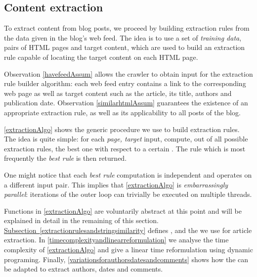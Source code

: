 \subsection{Content extraction}
\label{contentextraction}

To extract content from blog posts, we proceed by building extraction rules from the data given in the blog's web feed. The idea is to use a set of \emph{training data}, pairs of HTML pages and target content, which are used to build an extraction rule capable of locating the target content on each HTML page.

Observation \ref{havefeedAssum} allows the crawler to obtain input for the extraction rule builder algorithm: each web feed entry contains a link to the corresponding web page as well as target content such as the article, its title, authors and publication date. Observation \ref{similarhtmlAssum} guarantees the existence of an appropriate extraction rule, as well as its applicability to all posts of the blog.

\autoref{extractionAlgo} shows the generic procedure we use to build extraction rules. The idea is quite simple: for each \code{(}\emph{page, target}\code{)} input, compute, out of all possible extraction rules, the best one with respect to a certain . The rule which is most frequently the \emph{best rule} is then returned.

\extractionAlgo

One might notice that each \emph{best rule} computation is independent and operates on a different input pair. This implies that \autoref{extractionAlgo} is \emph{embarrassingly parallel}: iterations of the outer loop can trivially be executed on multiple threads.

Functions in \autoref{extractionAlgo} are voluntarily abstract at this point and will be explained in detail in the remaining of this section.
\hyperref[extractionrulesandstringsimilarity]{Subsection~\ref*{extractionrulesandstringsimilarity}} %
defines ,  and the  we use for article extraction. In \autoref{timecomplexityandlinearreformulation} we analyse the time complexity of \autoref{extractionAlgo} and give a linear time reformulation using dynamic programing. Finally, \autoref{variationsforauthorsdatesandcomments} shows how the  can be adapted to extract authors, dates and comments.

